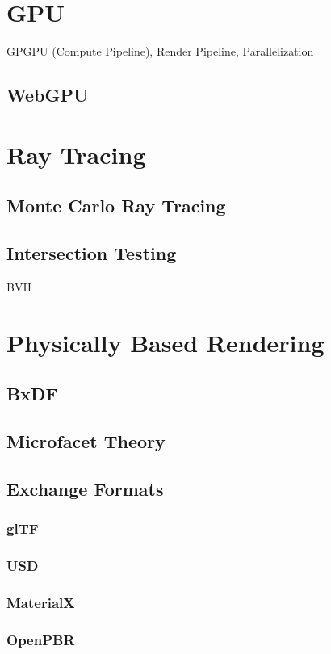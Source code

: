 
\section{GPU}
GPGPU (Compute Pipeline), Render Pipeline, Parallelization
\subsection{WebGPU}

\section{Ray Tracing}
\subsection{Monte Carlo Ray Tracing}
\subsection{Intersection Testing}
BVH

\section{Physically Based Rendering}
\subsection{BxDF}
\subsection{Microfacet Theory}
\subsection{Exchange Formats}
\subsubsection{glTF}
\subsubsection{USD}

\subsubsection{MaterialX}
\subsubsection{OpenPBR}
